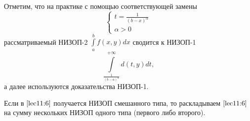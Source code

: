 \documentclass[../../main.tex]{subfiles}
\begin{document}
	Отметим, что на практике с помощью соответствующей замены 
	\[\displaystyle 
	\left\{
		\begin{gathered}
			t = \frac{1}{(b - x)^\alpha} \\
			\alpha > 0
		\end{gathered}
	\right.
	\]
	рассматриваемый НИЗОП-2 $\int\limits_a^b f(x, y) dx$ сводится к НИЗОП-1 
	\begin{equation}\label{lec11:6}
		\int\limits_{\tfrac{1}{(b - a)^\alpha}}^{+\infty} d(t, y) dt,
	\end{equation}
	а далее используются доказательства НИЗОП-1.
	
	Если в $\eqref{lec11:6}$ получается НИЗОП смешанного типа, то раскладываем 
	$\eqref{lec11:6}$ на сумму нескольких НИЗОП одного типа (первого либо 
	второго).
\end{document}
